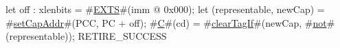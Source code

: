 let off : xlenbits = #\hyperref[sailRISCVzEXTS]{EXTS}#(imm @ 0x000);
let (representable, newCap) = #\hyperref[sailRISCVzsetCapAddr]{setCapAddr}#(PCC, PC + off);
#\hyperref[sailRISCVzC]{C}#(cd) = #\hyperref[sailRISCVzclearTagIf]{clearTagIf}#(newCap, #\hyperref[sailRISCVznot]{not}#(representable));
RETIRE_SUCCESS
